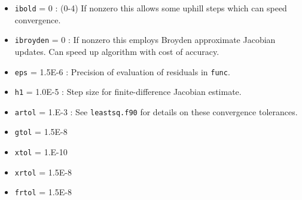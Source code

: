 \documentclass[12pt,pdf,singlespace]{article}
\begin{document}

\begin{itemize}

\item \texttt{ibold} = 0 : (0-4) If nonzero this allows some uphill steps which can speed convergence.
\item \texttt{ibroyden} = 0 : If nonzero this employs Broyden approximate Jacobian updates. Can speed up algorithm with cost of accuracy.
\item \texttt{eps} = 1.5E-6 : Precision of evaluation of residuals in \texttt{func}.


\item \texttt{h1} = 1.0E-5 : Step size for finite-difference Jacobian estimate.
\item \texttt{artol} = 1.E-3 : See \texttt{leastsq.f90} for details on these convergence tolerances.
\item \texttt{gtol} = 1.5E-8
\item \texttt{xtol} = 1.E-10
\item \texttt{xrtol} = 1.5E-8
\item \texttt{frtol} = 1.5E-8

\end{itemize}



\end{document}
